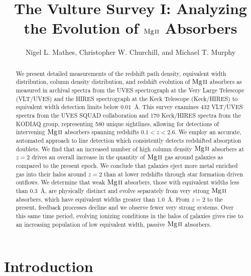\documentclass[iop,apj,numberedappendix,appendixfloats,twocolappendix]{emulateapj}
\begin{document}
\title{The Vulture Survey I: Analyzing the Evolution of ${\hbox{{\rm Mg}\kern 0.1em{\sc ii}}}$ Absorbers}

\author{
Nigel L. Mathes,
Christopher W. Churchill,
and
Michael T. Murphy
}


\begin{abstract}
We present detailed measurements of the redshift path density, equivalent width distribution, column density distribution, and redshift evolution of ${\hbox{{\rm Mg}\kern 0.1em{\sc ii}}}$ absorbers as measured in archival spectra from the UVES spectrograph at the Very Large Telescope (VLT/UVES) and the HIRES spectrograph at the Keck Telescope (Keck/HIRES) to equivalent width detection limits below $0.01$~{\AA}. This survey examines 432 VLT/UVES spectra from the UVES SQUAD collaboration and 170 Keck/HIRES spectra from the KODIAQ group, representing 580 unique sightlines, allowing for detections of intervening ${\hbox{{\rm Mg}\kern 0.1em{\sc ii}}}$ absorbers spanning redshifts $0.1 < z < 2.6$. We employ an accurate, automated approach to line detection which consistently detects redshifted absorption doublets. We find that an increased number of high column density ${\hbox{{\rm Mg}\kern 0.1em{\sc ii}}}$ absorbers at $z = 2$ drives an overall increase in the quantity of ${\hbox{{\rm Mg}\kern 0.1em{\sc ii}}}$ gas around galaxies as compared to the present epoch. We conclude that galaxies eject more metal enriched gas into their halos around $z = 2$ than at lower redshifts through star formation driven outflows. We determine that weak ${\hbox{{\rm Mg}\kern 0.1em{\sc ii}}}$ absorbers, those with equivalent widths less than $0.3$~{\AA}, are physically distinct and evolve separately from very strong ${\hbox{{\rm Mg}\kern 0.1em{\sc ii}}}$ absorbers, which have equivalent widths greater than $1.0$~{\AA}. From $z = 2$ to the present, feedback processes decline and we observe fewer very strong systems. Over this same time period, evolving ionizing conditions in the halos of galaxies gives rise to an increasing population of low equivalent width, passive ${\hbox{{\rm Mg}\kern 0.1em{\sc ii}}}$ absorbers.

\end{abstract}



\section{Introduction}
\label{sec:intro}
\end{document}
